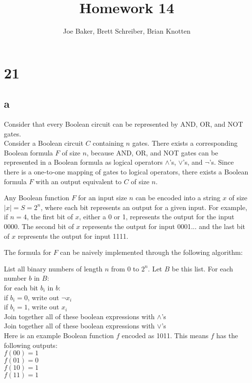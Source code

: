 \documentclass[letterpaper,notitlepage,twoside]{article}
\newcommand\tab[1][1cm]{\hspace*{#1}} %
\begin{document}
\title{Homework 14}
\author{Joe Baker, Brett Schreiber, Brian Knotten}
\maketitle

\section*{21}

\subsection*{a}
Consider that every Boolean circuit can be represented by AND, OR, and NOT gates. \\
Consider a Boolean circuit $C$ containing $n$ gates. There exists a corresponding Boolean formula $F$ of size $n$, because AND, OR, and NOT gates can be represented in a Boolean formula as logical operators $\land$'s, $\lor$'s, and $\neg$'s. Since there is a one-to-one mapping of gates to logical operators, there exists a Boolean formula $F$ with an output equivalent to $C$ of size $n$.

Any Boolean function $F$ for an input size $n$ can be encoded into a string $x$ of size $|x| = S = 2^n$, where each bit represents an output for a given input. For example, if $n = 4$, the first bit of $x$, either a 0 or 1, represents the output for the input 0000. The second bit of $x$ represents the output for input 0001... and the last bit of $x$ represents the output for input 1111.

The formula for $F$ can be naively implemented through the following algorithm:

List all binary numbers of length $n$ from $0$ to $2^n$. Let $B$ be this list.
For each number $b$ in $B$: \\
\tab for each bit $b_i$ in $b$: \\
\tab\tab if $b_i = 0$, write out $\neg x_i$ \\
\tab\tab if $b_i = 1$, write out $x_i$ \\
\tab Join together all of these boolean expressions with $\land$'s \\
Join together all of these boolean expressions with $\lor$'s \\

Here is an example Boolean function $f$ encoded as 1011. This means $f$ has the following outputs: \\
$f(00) = 1$ \\
$f(01) = 0$ \\
$f(10) = 1$ \\
$f(11) = 1$ \\
\end{document}
